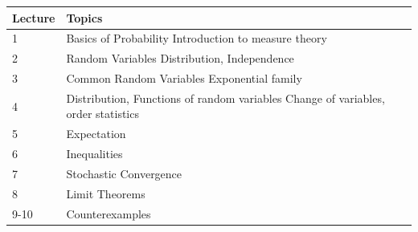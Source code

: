 \documentclass[12pt]{article}
\begin{document}
\begin{longtable}{| p{1.5cm}  | p{8cm} | p{3cm} |}
\hline
{\bf{Lecture}}  & {\bf{Topics}} \\
\hline
1  & Basics of Probability \newline Introduction to measure theory \\
\hline
2 &  Random Variables \newline Distribution, Independence \\
\hline
3  & Common Random Variables \newline Exponential family \\
\hline
4  & Distribution, Functions of random variables  \newline Change of variables, order statistics \\
\hline
5  & Expectation  \\
\hline
6  &  Inequalities \\
\hline
7  &  Stochastic Convergence \\
 \hline
8  &  Limit Theorems  \\
\hline
9-10  &  Counterexamples  \\
\hline
\end{longtable}
\end{document}
